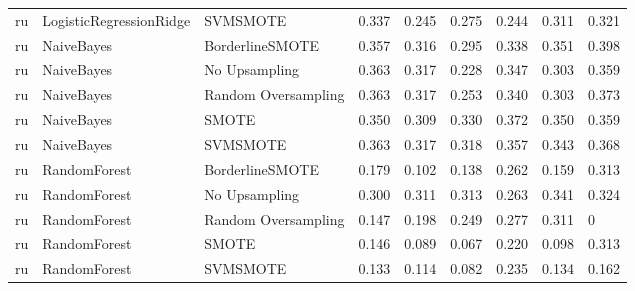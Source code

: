 \begin{tabular}{lllllllll}
      ru &      LogisticRegressionRidge &            SVMSMOTE & 0.337 &                     0.245 &                 0.275 &                  0.244 &                                   0.311 &     0.321 \\
      ru &                   NaiveBayes &     BorderlineSMOTE & 0.357 &                     0.316 &                 0.295 &                  0.338 &                                   0.351 &     0.398 \\
      ru &                   NaiveBayes &       No Upsampling & 0.363 &                     0.317 &                 0.228 &                  0.347 &                                   0.303 &     0.359 \\
      ru &                   NaiveBayes & Random Oversampling & 0.363 &                     0.317 &                 0.253 &                  0.340 &                                   0.303 &     0.373 \\
      ru &                   NaiveBayes &               SMOTE & 0.350 &                     0.309 &                 0.330 &                  0.372 &                                   0.350 &     0.359 \\
      ru &                   NaiveBayes &            SVMSMOTE & 0.363 &                     0.317 &                 0.318 &                  0.357 &                                   0.343 &     0.368 \\
      ru &                 RandomForest &     BorderlineSMOTE & 0.179 &                     0.102 &                 0.138 &                  0.262 &                                   0.159 &     0.313 \\
      ru &                 RandomForest &       No Upsampling & 0.300 &                     0.311 &                 0.313 &                  0.263 &                                   0.341 &     0.324 \\
      ru &                 RandomForest & Random Oversampling & 0.147 &                     0.198 &                 0.249 &                  0.277 &                                   0.311 &         0 \\
      ru &                 RandomForest &               SMOTE & 0.146 &                     0.089 &                 0.067 &                  0.220 &                                   0.098 &     0.313 \\
      ru &                 RandomForest &            SVMSMOTE & 0.133 &                     0.114 &                 0.082 &                  0.235 &                                   0.134 &     0.162 \\

\end{tabular}
